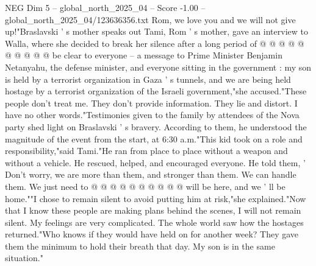 \begin{textsample}{NEG Dim 5 – global\_north\_2025\_04 – Score -1.00 – global\_north\_2025\_04/123636356.txt}
Rom, we love you and we will not give up!"Braslavski ' s mother speaks out Tami, Rom ' s mother, gave an interview to Walla, where she decided to break her silence after a long period of @ @ @ @ @ @ @ @ @ @ be clear to everyone -- a message to Prime Minister Benjamin Netanyahu, the defense minister, and everyone sitting in the government : my son is held by a terrorist organization in Gaza ' s tunnels, and we are being held hostage by a terrorist organization of the Israeli government,"she accused."These people don't treat me.
They don't provide information.
They lie and distort.
I have no other words."Testimonies given to the family by attendees of the Nova party shed light on Braslavski ' s bravery.
According to them, he understood the magnitude of the event from the start, at 6:30 a.m."This kid took on a role and responsibility,"said Tami."He ran from place to place without a weapon and without a vehicle.
He rescued, helped, and encouraged everyone.
He told them, ' Don't worry, we are more than them, and stronger than them.
We can handle them.
We just need to @ @ @ @ @ @ @ @ @ @ will be here, and we ' ll be home.""I chose to remain silent to avoid putting him at risk,"she explained."Now that I know these people are making plans behind the scenes, I will not remain silent.
My feelings are very complicated.
The whole world saw how the hostages returned."Who knows if they would have held on for another week?
They gave them the minimum to hold their breath that day.
My son is in the same situation."

\end{textsample}
